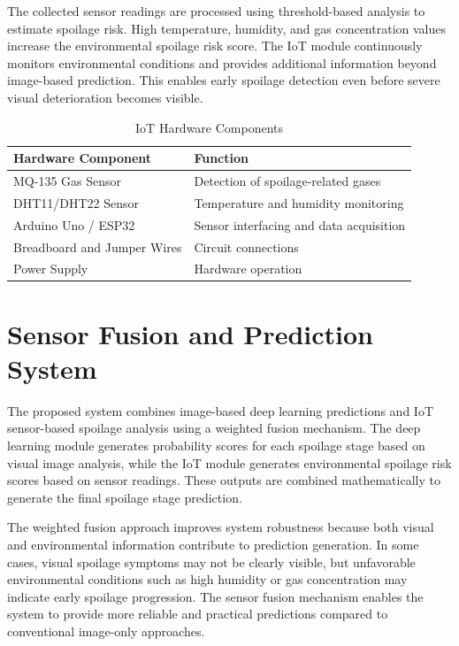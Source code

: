 The collected sensor readings are processed using threshold-based analysis to estimate spoilage risk. High temperature, humidity, and gas concentration values increase the environmental spoilage risk score. The IoT module continuously monitors environmental conditions and provides additional information beyond image-based prediction. This enables early spoilage detection even before severe visual deterioration becomes visible.

\begin{table}[H]
	\centering
	\caption{IoT Hardware Components}
	\label{tab:hardware_components}
	\begin{tabular}{|l|l|}
		\hline
		\textbf{Hardware Component} & \textbf{Function} \\ \hline
		MQ-135 Gas Sensor & Detection of spoilage-related gases \\ \hline
		DHT11/DHT22 Sensor & Temperature and humidity monitoring \\ \hline
		Arduino Uno / ESP32 & Sensor interfacing and data acquisition \\ \hline
		Breadboard and Jumper Wires & Circuit connections \\ \hline
		Power Supply & Hardware operation \\ \hline
	\end{tabular}
\end{table}

\section[Sensor Fusion and Prediction System]{\textbf{Sensor Fusion and Prediction System}}
The proposed system combines image-based deep learning predictions and IoT sensor-based spoilage analysis using a weighted fusion mechanism. The deep learning module generates probability scores for each spoilage stage based on visual image analysis, while the IoT module generates environmental spoilage risk scores based on sensor readings. These outputs are combined mathematically to generate the final spoilage stage prediction.

The weighted fusion approach improves system robustness because both visual and environmental information contribute to prediction generation. In some cases, visual spoilage symptoms may not be clearly visible, but unfavorable environmental conditions such as high humidity or gas concentration may indicate early spoilage progression. The sensor fusion mechanism enables the system to provide more reliable and practical predictions compared to conventional image-only approaches.


